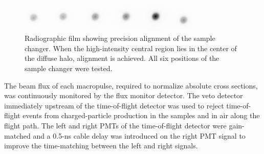 \begin{figure}[ht!]
    \centering
    \includegraphics[width=0.8\textwidth]{figures/TargetChangerAlignment.png}
    \caption[Radiographic film showing precision alignment of the sample changer]
    {
        Radiographic film showing precision alignment of the sample changer. When the high-intensity
        central region lies in the center of the diffuse halo, alignment is achieved. All six
        positions of the sample changer were tested.
    }
    \label{SampleChangerAlignment}
\end{figure}

The beam flux of each macropulse, required to normalize absolute cross sections, was continuously
monitored by the flux monitor detector. The veto detector immediately upstream
of the time-of-flight detector was used to reject time-of-flight events from
charged-particle production in the samples and in air along the flight path. The
left and right PMTs of the time-of-flight detector were gain-matched and a
0.5-ns cable delay was introduced on the right PMT signal to improve the
time-matching between the left and right signals.

